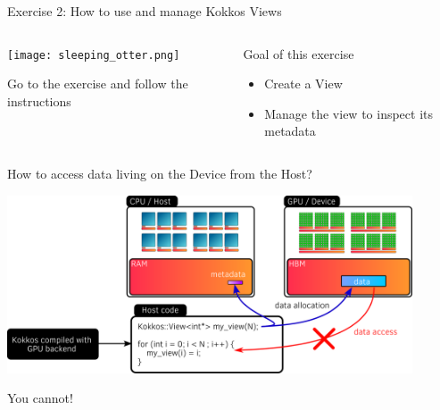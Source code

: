 \documentclass[
    aspectratio=169,
]{beamer}
\begin{document}

\begin{exerciseframe}{Exercise 2: How to use and manage Kokkos Views}
    \begin{columns}
        \begin{column}{0.5\linewidth}
            \begin{center}
                \texttt{[image: sleeping\_otter.png]}
            \end{center}

            Go to the exercise  and follow the instructions
        \end{column}
        \begin{column}{0.5\linewidth}
            \begin{block}{Goal of this exercise}
                \begin{itemize}
                    \item Create a View
                    \item Manage the view to inspect its metadata
                \end{itemize}
            \end{block}
        \end{column}
    \end{columns}
\end{exerciseframe}


\begin{frame}{How to access data living on the Device from the Host?}
    \begin{center}
        \includegraphics[width=0.9\textwidth]{device_memory_access.png}
    \end{center}

     You cannot!
\end{frame}
\end{document}
